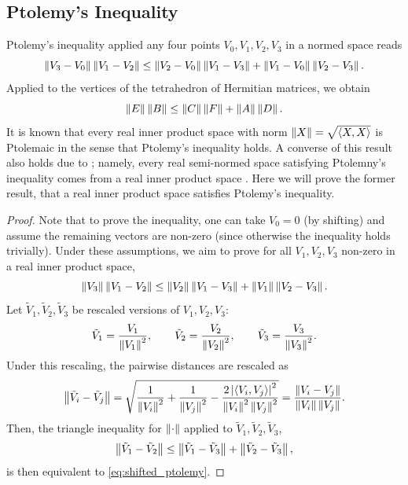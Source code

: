 \documentclass[notitlepage, 10pt]{article}
\begin{document}
\subsection{Ptolemy's Inequality}
Ptolemy's inequality applied any four points $V_0, V_1, V_2, V_3$ in a normed space reads
\begin{equation}
    \label{eq:vvvv_ptolemy}
    \left\lVert V_3-V_0\right\rVert\left\lVert V_1-V_2\right\rVert \leq \left\lVert V_2-V_0\right\rVert\left\lVert V_1-V_3\right\rVert + \left\lVert V_1-V_0\right\rVert\left\lVert V_2-V_3\right\rVert.
\end{equation}
Applied to the vertices of the tetrahedron of Hermitian matrices, we obtain
\begin{equation}
    \label{eq:abcdef_ptolemy}
    \left\lVert E\right\rVert\left\lVert B\right\rVert \leq \left\lVert C\right\rVert\left\lVert F\right\rVert + \left\lVert A\right\rVert\left\lVert D\right\rVert.
\end{equation}
It is known that every real inner product space with norm $\left\lVert X\right\rVert = \sqrt{\braket{X,X}}$ is Ptolemaic in the sense that Ptolemy's inequality holds. 
A converse of this result also holds due to \citeauthor{schoenberg1952remark}; namely, every real semi-normed space satisfying Ptolemny's inequality comes from a real inner product space \cite{schoenberg1952remark}.
Here we will prove the former result, that a real inner product space satisfies Ptolemy's inequality.
\begin{proof}
    Note that to prove the inequality, one can take $V_0 = 0$ (by shifting) and assume the remaining vectors are non-zero (since otherwise the inequality holds trivially).
    Under these assumptions, we aim to prove for all $V_1, V_2, V_3$ non-zero in a real inner product space,
    \begin{equation}
        \label{eq:shifted_ptolemy}
        \left\lVert V_3\right\rVert\left\lVert V_1-V_2\right\rVert \leq \left\lVert V_2\right\rVert\left\lVert V_1-V_3\right\rVert + \left\lVert V_1\right\rVert\left\lVert V_2-V_3\right\rVert.
    \end{equation}
    Let $\tilde V_1, \tilde V_2, \tilde V_3$ be rescaled versions of $V_1,V_2,V_3$:
    \begin{equation}
        \tilde V_1 = \frac{V_1}{\left\lVert V_1\right\rVert^2}, \qquad
        \tilde V_2 = \frac{V_2}{\left\lVert V_2\right\rVert^2}, \qquad
        \tilde V_3 = \frac{V_3}{\left\lVert V_3\right\rVert^2}.
    \end{equation}  
    Under this rescaling, the pairwise distances are rescaled as
    \begin{equation}
        \left\lVert\tilde V_i - \tilde V_j\right\rVert = \sqrt{\frac{1}{\left\lVert V_i\right\rVert^2} + \frac{1}{\left\lVert V_j\right\rVert^2} - \frac{2 \left|\braket{V_i,V_j}\right|^2}{\left\lVert V_i\right\rVert^2\left\lVert V_j\right\rVert^2}} = \frac{\left\lVert V_i-V_j\right\rVert}{\left\lVert V_i\right\rVert \left\lVert V_j\right\rVert}.
    \end{equation}
    Then, the triangle inequality for $\left\lVert\cdot\right\rVert$ applied to $\tilde V_1, \tilde V_2, \tilde V_3$,
    \begin{equation}
        \left\lVert \tilde V_1 - \tilde V_2\right\rVert \leq \left\lVert\tilde V_1 - \tilde V_3\right\rVert + \left\lVert\tilde V_2 - \tilde V_3\right\rVert,
    \end{equation}
    is then equivalent to \cref{eq:shifted_ptolemy}.
\end{proof}
\end{document}
